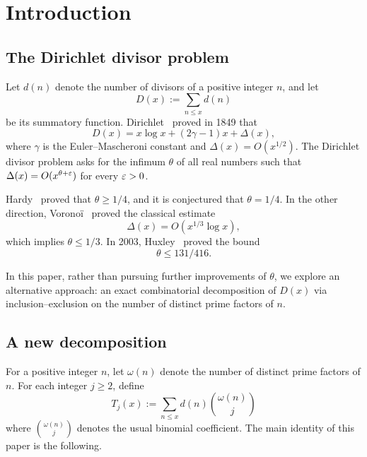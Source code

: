 \section{Introduction}

\subsection{The Dirichlet divisor problem}

Let $d(n)$ denote the number of divisors of a positive integer $n$, and let
\begin{equation}
    D(x) := \sum_{n \leq x} d(n)
\end{equation}
be its summatory function. Dirichlet~\cite{Dirichlet1849} proved
in 1849 that
\begin{equation}
    D(x) = x \log x + (2\gamma - 1) x + \Delta(x),
\end{equation}
where $\gamma$ is the Euler--Mascheroni constant and
$\Delta(x) = O(x^{1/2})$. The Dirichlet divisor problem asks for the
infimum $\theta$ of all real numbers such that
$\Delta(x) = O(x^{\theta + \varepsilon})$ for every $\varepsilon > 0$.

Hardy~\cite{Hardy1916} proved that $\theta\geq 1/4$, and it is
conjectured that $\theta=1/4$. In the other direction,
Vorono\"i~\cite{Voronoi1903} proved the classical estimate
\begin{equation}
    \Delta(x)=O(x^{1/3}\log x),
\end{equation}
which implies $\theta\leq 1/3$. In 2003, Huxley~\cite{Huxley2003}
proved the bound
\begin{equation}
    \theta \leq 131/416.
\end{equation}

In this paper, rather than pursuing further improvements of $\theta$,
we explore an alternative approach: an exact combinatorial decomposition
of $D(x)$ via inclusion--exclusion on the number of distinct prime
factors of $n$.

\subsection{A new decomposition}

For a positive integer $n$, let $\omega(n)$ denote the number of distinct prime factors of $n$. For each integer $j\geq2$, define
\begin{equation}\label{eq:Tj-def}
    T_j(x) := \sum_{n \leq x}d(n)\binom{\omega(n)}{j}
\end{equation}
where $\binom{\omega(n)}{j}$ denotes the usual binomial coefficient.
The main identity of this paper is the following.

